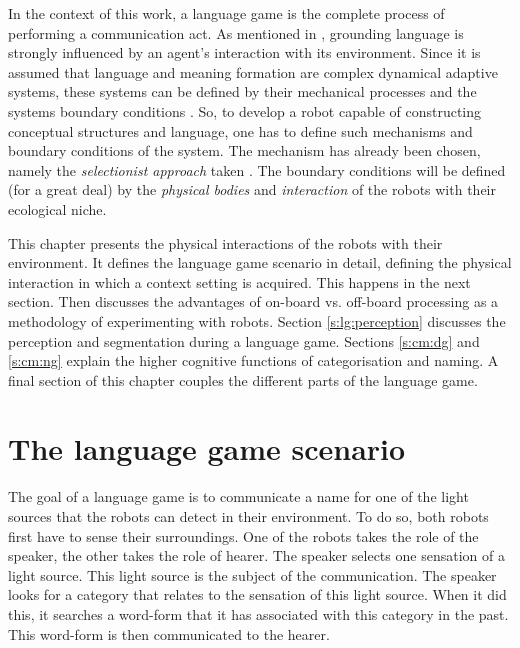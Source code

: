 

In the context of this work, a language game is the complete process of performing a communication act. As mentioned in , grounding language is strongly influenced by an agent's interaction with its environment. Since it is assumed that language and meaning formation are complex dynamical adaptive systems, these systems can be defined by their mechanical processes and the systems boundary conditions \citep{prigogine}. So, to develop a robot capable of constructing conceptual structures and language, one has to define such mechanisms and boundary conditions of the system. The mechanism has already been chosen, namely the {\em selectionist approach} taken \citep{steels:1996a,steels:1996b}. The boundary conditions will be defined (for a great deal) by the {\em physical bodies} and {\em interaction} of the robots with their ecological niche. 


This chapter presents the physical interactions of the robots with their environment. It defines the language game scenario in detail, defining the physical interaction in which a context setting is acquired. This happens in the next section. Then  discusses the advantages of on-board vs. off-board processing as a methodology of experimenting with robots.  Section \ref{s:lg:perception} discusses the perception and segmentation during a language game. Sections \ref{s:cm:dg} and \ref{s:cm:ng} explain the higher cognitive functions of categorisation and naming. A final section of this chapter couples the different parts of the language game.


\section{The language game scenario}\label{s:lg:scenario}



The goal of a language game is to communicate a name for one of the light sources that the robots can detect in their environment. To do so, both robots first have to sense their surroundings. One of the robots takes the role of the speaker, the other takes the role of hearer. The speaker selects one sensation of a light source. This light source is the subject of the communication. The speaker looks for a category that relates to the sensation of this light source. When it did this, it searches a word-form that it has associated with this category in the past. This word-form is then communicated to the hearer. 

